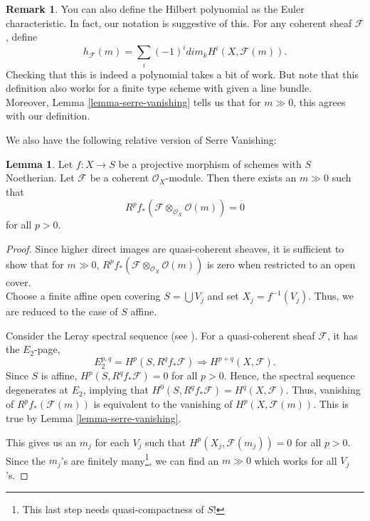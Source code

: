 \documentclass[11pt]{amsart}
\newcommand{\sF}{{\mathcal F}}
\theoremstyle{definition}
\newtheorem{lemma}[theorem]{Lemma}
\newtheorem{remark}[theorem]{Remark}
\begin{document}
\begin{remark}
	You can also define the Hilbert polynomial as the Euler characteristic. In fact, our notation is suggestive of this. For any coherent sheaf $\sF$, define
	\[h_{\sF}(m)= \sum_i (-1)^i dim_k H^i(X,\sF(m)).\]
	Checking that this is indeed a polynomial takes a bit of work. But note that this definition also works for a finite type scheme with given a line bundle.\\
	Moreover, Lemma \ref{lemma-serre-vanishing} tells us that for $m\gg 0$, this agrees with our definition.
\end{remark}

We also have the following relative version of Serre Vanishing:

\begin{lemma}\cite[Tag 02O1]{stacks-project}
	\label{lemma-relative-serre-vanishing}
	Let $f : X \to S$ be a projective morphism of schemes with $S$ Noetherian.
	Let $\mathcal{F}$ be a coherent $\mathcal{O}_X$-module.
	Then there exists an $m\gg 0$ such that
	$$
	R^pf_*\left(\mathcal{F} \otimes_{\mathcal{O}_X} \mathcal{O}(m)\right)
	=
	0
	$$
	for all $p > 0$.
\end{lemma}

\begin{proof}
	Since higher direct images are quasi-coherent sheaves, it is sufficient to show that for $m\gg 0$, $R^pf_*\left(\mathcal{F} \otimes_{\mathcal{O}_X} \mathcal{O}(m)\right)$ is zero when restricted to an open cover.\\
	Choose a finite affine open covering $S = \bigcup V_j$ and
	set $X_j = f^{-1}(V_j)$. Thus, we are reduced to the case of $S$ affine.
	
	Consider the Leray spectral sequence (see \cite[Tag 01F2]{stacks-project}). For a quasi-coherent sheaf $\sF$, it has the $E_2$-page,
	\[E_2^{p,q}=H^p(S,R^qf_*\sF)\Rightarrow H^{p+q}(X,\sF).\]
	Since $S$ is affine, $H^p(S,R^qf_*\sF)=0$ for all $p>0$. Hence, the spectral sequence degenerates at $E_2$, implying that $H^0(S,R^qf_*\sF)= H^{q}(X,\sF)$. Thus, vanishing of
	$R^pf_*(\mathcal{F}(m))$
	is equivalent to the vanishing of
	$H^p(X, \mathcal{F}(m))$. This is true by Lemma \ref{lemma-serre-vanishing}.
	
	This gives us an $m_j$ for each $V_j$ such that $H^p(X_j, \mathcal{F}(m_j))=0$ for all $p>0$. Since the $m_j$'s are finitely many\footnote{This last step needs quasi-compactness of $S$!}, we can find an $m\gg 0$ which works for all $V_j$'s.
\end{proof}
\end{document}

